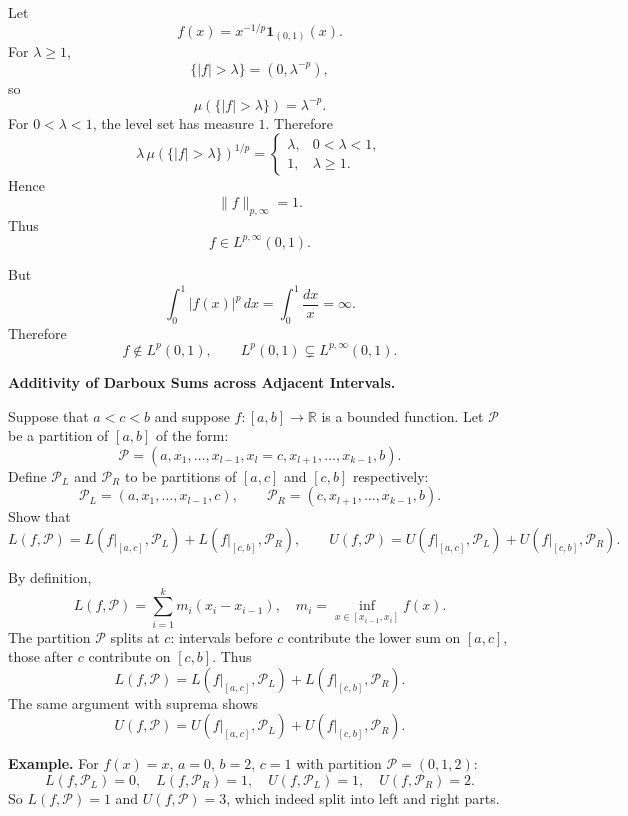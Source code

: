 \begin{solution}
Let
\[
f(x)
=
x^{-1/p}\mathbf1_{(0,1)}(x).
\]
For \(\lambda\ge1\),
\[
\{|f|>\lambda\}
=
(0,\lambda^{-p}),
\]
so
\[
\mu(\{|f|>\lambda\})
=
\lambda^{-p}.
\]
For \(0<\lambda<1\), the level set has measure \(1\). Therefore
\[
\lambda\,\mu(\{|f|>\lambda\})^{1/p}
=
\begin{cases}
\lambda,&0<\lambda<1,\\
1,&\lambda\ge1.
\end{cases}
\]
Hence
\[
\boxed{
\|f\|_{p,\infty}=1.
}
\]
Thus
\[
f\in L^{p,\infty}(0,1).
\]

But
\[
\int_0^1|f(x)|^p\,dx
=
\int_0^1\frac{dx}{x}
=
\infty.
\]
Therefore
\[
\boxed{
f\notin L^p(0,1),
\qquad
L^p(0,1)\subsetneq L^{p,\infty}(0,1).
}
\]
\end{solution}


\begin{problem}[CP-II-0570]
\label{prob:cp-ii-0570}
\textbf{Additivity of Darboux Sums across Adjacent Intervals.}

\hspace*{1.5em}Suppose that $a < c < b$ and suppose $f : [a,b] \to \mathbb{R}$ is a bounded function.
Let $\mathcal{P}$ be a partition of $[a,b]$ of the form:
\[
\mathcal{P} = (a, x_1,\ldots,x_{l-1},x_l=c,x_{l+1},\ldots,x_{k-1},b).
\]
Define $\mathcal{P}_L$ and $\mathcal{P}_R$ to be partitions of $[a,c]$ and $[c,b]$ respectively:
\[
\mathcal{P}_L = (a,x_1,\ldots,x_{l-1},c), \qquad
\mathcal{P}_R = (c,x_{l+1},\ldots,x_{k-1},b).
\]
Show that
\[
L(f,\mathcal{P}) = L(f|_{[a,c]},\mathcal{P}_L) + L(f|_{[c,b]},\mathcal{P}_R), \qquad
U(f,\mathcal{P}) = U(f|_{[a,c]},\mathcal{P}_L) + U(f|_{[c,b]},\mathcal{P}_R).
\]
\end{problem}

\begin{solution}
By definition,
	\[
	L(f,\mathcal{P}) = \sum_{i=1}^k m_i (x_i-x_{i-1}), \quad
	m_i = \inf_{x\in[x_{i-1},x_i]} f(x).
	\]
	The partition $\mathcal{P}$ splits at $c$: intervals before $c$ contribute the lower sum on $[a,c]$,
	those after $c$ contribute on $[c,b]$. Thus
	\[
	L(f,\mathcal{P}) = L(f|_{[a,c]},\mathcal{P}_L) + L(f|_{[c,b]},\mathcal{P}_R).
	\]
	The same argument with suprema shows
	\[
	U(f,\mathcal{P}) = U(f|_{[a,c]},\mathcal{P}_L) + U(f|_{[c,b]},\mathcal{P}_R).
	\]

	\textbf{Example.} For $f(x)=x$, $a=0$, $b=2$, $c=1$ with partition $\mathcal{P}=(0,1,2)$:
	\[
	L(f,\mathcal{P}_L)=0, \quad L(f,\mathcal{P}_R)=1, \quad
	U(f,\mathcal{P}_L)=1, \quad U(f,\mathcal{P}_R)=2.
	\]
	So $L(f,\mathcal{P})=1$ and $U(f,\mathcal{P})=3$, which indeed split into left and right parts.
\end{solution}


